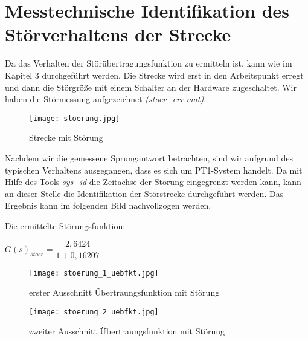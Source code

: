 
\newpage
[Perkowski]
\section{Messtechnische Identifikation des Störverhaltens der Strecke}
Da das Verhalten der Störübertragungsfunktion zu ermitteln ist, kann wie im Kapitel 3 durchgeführt werden. Die Strecke wird erst in den Arbeitspunkt erregt und dann die Störgröße mit einem Schalter an der Hardware zugeschaltet. Wir haben die Störmessung aufgezeichnet \textit{(stoer\_err.mat)}.

\begin{figure}[h]
	\begin{center}
		\texttt{[image: stoerung.jpg]}
		\caption{Strecke mit Störung}
       \label{stoer}
	\end{center} 
\end{figure}

Nachdem wir die gemessene Sprungantwort betrachten, sind wir aufgrund des typischen Verhaltens ausgegangen, dass es sich um PT1-System handelt. 
Da mit Hilfe des Tools \textit{sys\_id} die Zeitachse der Störung eingegrenzt werden kann, kann an dieser Stelle die Identifikation der Störstrecke durchgeführt werden. Das Ergebnis kann im folgenden Bild nachvollzogen werden.

Die ermittelte Störungsfunktion:

$ G(s)_{stoer} = \dfrac{2,6424}{1 + 0,16207} $

\begin{figure}[h]
	\begin{center}
		\texttt{[image: stoerung\_1\_uebfkt.jpg]}
		\caption{erster Ausschnitt Übertraungsfunktion mit Störung}
       \label{stoerfkt1}
	\end{center} 
\end{figure}

\begin{figure}[h]
	\begin{center}
		\texttt{[image: stoerung\_2\_uebfkt.jpg]}
		\caption{zweiter Ausschnitt Übertraungsfunktion mit Störung}
       \label{stoerfkt2}
	\end{center} 
\end{figure}

